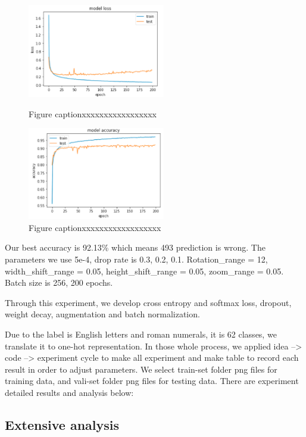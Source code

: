 \documentclass[twoside,twocolumn]{article}
\begin{document}
\begin{figure}[h]
\includegraphics[width=6cm]{model_loss.png}
\centering
\caption{Figure captionxxxxxxxxxxxxxxxxx}\label{fig1}

\includegraphics[width=6cm]{model_acc.png}
\centering
\caption{Figure captionxxxxxxxxxxxxxxxxxx}\label{fig2}
\end{figure}



Our best accuracy is 92.13\% which means 493 prediction is wrong. The parameters we use 5e-4, drop rate is 0.3, 0.2, 0.1. Rotation\_range = 12, width\_shift\_range = 0.05, height\_shift\_range = 0.05, zoom\_range = 0.05. Batch size is 256, 200 epochs.

Through this experiment, we develop cross entropy and softmax loss, dropout, weight decay, augmentation and batch normalization.

Due to the label is English letters and roman numerals, it is 62 classes, we translate it to one-hot representation. In those whole process, we applied idea --> code --> experiment cycle to make all experiment and make table to record each result in order to adjust parameters. 
We select train-set folder png files for training data, and vali-set folder png files for testing data. There are experiment detailed results and analysis below:


\subsection{Extensive analysis}
\end{document}
